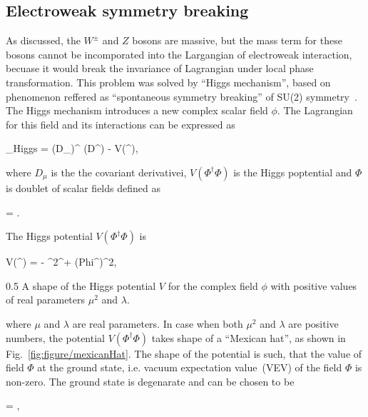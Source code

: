 \subsection{Electroweak symmetry breaking}

As discussed, the $W^{\pm}$ and $Z$ bosons are massive, but the mass term for these bosons cannot be incomporated into the Largangian of electroweak interaction, becuase it would break the invariance of Lagrangian under local phase transformation. This problem was solved by ``Higgs mechanism'', based on phenomenon reffered as ``spontaneous symmetry breaking'' of SU(2) symmetry~\cite{Englert:1964et, Higgs:1964ia, Guralnik:1964eu}. The Higgs mechanism introduces a new complex scalar field $\phi$. The Lagrangian for this field and its interactions can be expressed as 

{
    _{Higgs} =  (D_{\mu}\Phi)^{\dagger} (D^{\mu}\Phi) - V(\Phi^{\dagger}\Phi),
}

where $D_{\mu}$ is the the covariant derivativei, $V(\Phi^{\dagger}\Phi)$ is the Higgs poptential and $\Phi$ is doublet of scalar fields defined as


{
    \Phi = .
}

The Higgs potential $V(\Phi^{\dagger}\Phi)$ is

{
    V(\Phi^{\dagger}\Phi) =  -  \mu^{2}\Phi^{\dagger}\Phi +  \lambda(Phi^{\dagger}\Phi)^{2},
}


                 {0.5}       %
                 { A shape of the Higgs potential $V$ for the complex field $\phi$ with positive values of real parameters $\mu^{2}$ and $\lambda$.}

where $\mu$ and $\lambda$ are real parameters. In case when both $\mu^{2}$ and $\lambda$ are positive numbers, the potential $V(\Phi^{\dagger}\Phi)$ takes shape of a ``Mexican hat'', as shown in Fig.~\ref{fig:figure/mexicanHat}. The shape of the potential is such, that the value of field $\Phi$ at the ground state, i.e. vacuum expectation value~(VEV) of the field $\Phi$ is non-zero. The ground state is degenarate and can be chosen to be

{
      \rangle =  ,
}

